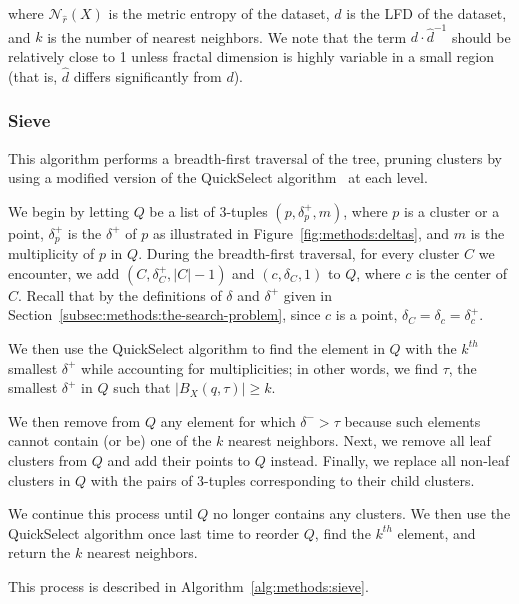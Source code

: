 where $\mathcal{N}_{\hat{r}}(X)$ is the metric entropy of the dataset, $d$ is the LFD of the dataset, and $k$ is the number of nearest neighbors.
We note that the term $d \cdot \hat{d}^{-1}$ should be relatively close to 1 unless fractal dimension is highly variable in a small region (that is, $\hat{d}$ differs significantly from $d$).


\subsubsection{Sieve}
\label{subsubsec:methods:knn:sieve}

This algorithm performs a breadth-first traversal of the tree, pruning clusters by using a modified version of the QuickSelect algorithm~\cite{hoare1961algorithm} at each level.

We begin by letting $Q$ be a list of 3-tuples $(p, \delta^{+}_{p}, m)$, where $p$ is a cluster or a point, $\delta^{+}_{p}$ is the $\delta^{+}$ of $p$ as illustrated in Figure~\ref{fig:methods:deltas}, and $m$ is the multiplicity of $p$ in $Q$.
During the breadth-first traversal, for every cluster $C$ we encounter, we add $(C, \delta^{+}_{C}, |C| - 1)$ and $(c, \delta_{C}, 1)$ to $Q$, where $c$ is the center of $C$.
Recall that by the definitions of $\delta$ and $\delta^{+}$ given in Section~\ref{subsec:methods:the-search-problem}, since $c$ is a point, $\delta_{C} = \delta_{c} = \delta^{+}_{c}$.



We then use the QuickSelect algorithm to find the element in $Q$ with the $k^{th}$ smallest $\delta^{+}$ while accounting for multiplicities; in other words, we find $\tau$, the smallest $\delta^{+}$ in $Q$ such that $\left| B_X(q, \tau) \right| \geq k$.

We then remove from $Q$ any element for which $\delta^{-} > \tau$ because such elements cannot contain (or be) one of the $k$ nearest neighbors.
Next, we remove all leaf clusters from $Q$ and add their points to $Q$ instead.
Finally, we replace all non-leaf clusters in $Q$ with the pairs of 3-tuples corresponding to their child clusters.

We continue this process until $Q$ no longer contains any clusters.
We then use the QuickSelect algorithm once last time to reorder $Q$, find the $k^{th}$ element, and return the $k$ nearest neighbors.

This process is described in Algorithm~\ref{alg:methods:sieve}. 

